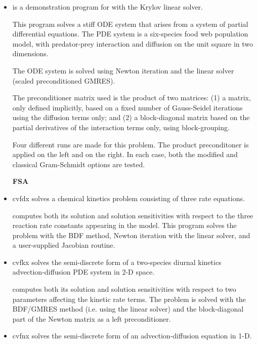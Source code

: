 \begin{itemize}
\item {}
  is a demonstration program for {\cvode} with the Krylov linear solver.

  This program solves a stiff ODE system that arises from a system     
  of partial differential equations.  The PDE system is a six-species
  food web population model, with predator-prey interaction and diffusion 
  on the unit square in two dimensions.

  The ODE system is solved using Newton iteration and the      
  {\cvspgmr} linear solver (scaled preconditioned GMRES).

  The preconditioner matrix used is the product of two matrices:         
  (1) a matrix, only defined implicitly, based on a fixed number of     
  Gauss-Seidel iterations using the diffusion terms only; and               
  (2) a block-diagonal matrix based on the partial derivatives of the   
  interaction terms only, using block-grouping.                          

  Four different runs are made for this problem.                        
  The product preconditoner is applied on the left and on the right.    
  In each case, both the modified and classical Gram-Schmidt options    
  are tested.

\item[{\bf FSA}]

\item{cvfdx}
  solves a chemical kinetics problem consisting of three rate equations.

  {\cvodes} computes both its solution and solution sensitivities with respect
  to the three reaction rate constants appearing in the model. 
  This program solves the problem with the BDF method, Newton          
  iteration with the {\cvdense} linear solver, and a user-supplied    
  Jacobian routine.

\item{cvfkx}
  solves the semi-discrete form of a two-species diurnal kinetics
  advection-diffusion PDE system in 2-D space.

  {\cvodes} computes both its solution and solution sensitivities with respect
  to two parameters affecting the kinetic rate terms.
  The problem is solved with the BDF/GMRES method (i.e.    
  using the {\cvspgmr} linear solver) and the block-diagonal part of the  
  Newton matrix as a left preconditioner.

\item{cvfnx}
  solves the semi-discrete form of an advection-diffusion equation in 1-D.


\end{itemize}
